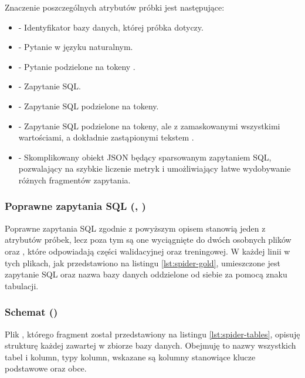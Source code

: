 Znaczenie poszczególnych atrybutów próbki jest następujące:
\begin{itemize}
    \item \textbf{} - Identyfikator bazy danych, której próbka dotyczy.
    \item \textbf{} - Pytanie w języku naturalnym.
    \item \textbf{} - Pytanie podzielone na tokeny .
    \item \textbf{} - Zapytanie SQL.
    \item \textbf{} - Zapytanie SQL podzielone na tokeny.
    \item \textbf{} - Zapytanie SQL podzielone na tokeny, ale z zamaskowanymi wszystkimi wartościami, a dokładnie zastąpionymi tekstem .
    \item \textbf{} - Skomplikowany obiekt JSON będący sparsowanym zapytaniem SQL, pozwalający na szybkie liczenie metryk i umożliwiający łatwe wydobywanie różnych fragmentów zapytania.
\end{itemize}

\subsubsection{Poprawne zapytania SQL (, )}
Poprawne zapytania SQL zgodnie z powyższym opisem stanowią jeden z atrybutów próbek, lecz poza tym są one wyciągnięte do dwóch osobnych plików  oraz , które odpowiadają części walidacyjnej oraz treningowej. W każdej linii w tych plikach, jak przedstawiono na listingu \ref{lst:spider-gold}, umieszczone jest zapytanie SQL oraz nazwa bazy danych oddzielone od siebie za pomocą znaku tabulacji.

\begin{minipage}{\linewidth}

\end{minipage}

\subsubsection{Schemat ()}
Plik , którego fragment został przedstawiony na listingu \ref{lst:spider-tables}, opisuję strukturę każdej zawartej w zbiorze  bazy danych. Obejmuję to nazwy wszystkich tabel i kolumn, typy kolumn, wskazane są kolumny stanowiące klucze podstawowe oraz obce.


